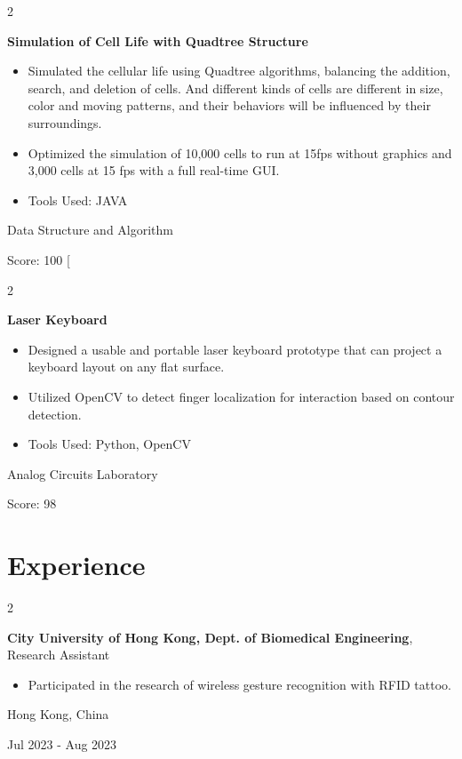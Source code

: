 \documentclass[10pt, letterpaper]{article}
\newenvironment{highlights}{
    \begin{itemize}[
        topsep=0.10 cm,
        parsep=0.10 cm,
        partopsep=0pt,
        itemsep=0pt,
        leftmargin=0.4 cm + 10pt
    ]
}{
    \end{itemize}
} %
\newenvironment{twocolentry}[2][]{
    \onecolentry
    \def\secondColumn{#2}
    \setcolumnwidth{\fill, 4.5 cm}
    \begin{paracol}{2}
}{
    \switchcolumn \raggedleft \secondColumn
    \end{paracol}
    \endonecolentry
} %
\let\hrefWithoutArrow\href
\renewcommand{\href}[2]{\hrefWithoutArrow{#1}{\ifthenelse{\equal{#2}{}}{ }{#2 }\raisebox{.15ex}{\footnotesize \faExternalLink*}}}
\begin{document}
        \vspace{0.15 cm}

        \begin{twocolentry}{
            \small{Data Structure and Algorithm}
            
            Score: 100 [\href{https://github.com/Smangic/DSAA-B-Final-Project}{Github]}
        }
            \textbf{Simulation of Cell Life with Quadtree Structure}
            \begin{highlights}
                \item \small{Simulated the cellular life using Quadtree algorithms, balancing the addition, search, and deletion of cells. And}
                different kinds of cells are different in size, color and moving patterns, and their behaviors will be influenced by their surroundings.
                \item Optimized the simulation of 10,000 cells to run at 15fps without graphics and 3,000 cells at 15 fps with a full real-time GUI.
                \item Tools Used: JAVA
            \end{highlights}
        \end{twocolentry}

        \vspace{0.15 cm}
        \begin{twocolentry}{
            \small{Analog Circuits Laboratory}
            
            Score: 98\href{https://github.com/Smangic/Laser-keyboard}{[Github]}
        }
            \textbf{Laser Keyboard}
            \begin{highlights}
                \item \small{Designed a usable and portable laser keyboard prototype that can project a keyboard layout on any flat surface.}
                \item Utilized OpenCV to detect finger localization for interaction based on contour detection.
                \item Tools Used: Python, OpenCV
            \end{highlights}
        \end{twocolentry}

    \section{Experience}



        
        \begin{twocolentry}{
            Hong Kong, China

        Jul 2023 - Aug 2023
        }
            \textbf{City University of Hong Kong, Dept. of Biomedical Engineering}, Research Assistant
            \begin{highlights}
                \item Participated in the research of wireless gesture recognition with RFID tattoo.
            \end{highlights}
        \end{twocolentry}
\end{document}
